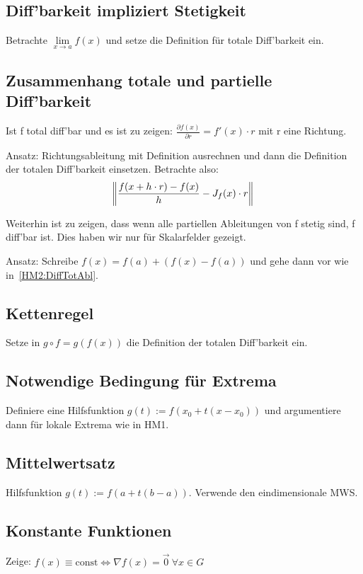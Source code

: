   \subsection{Diff'barkeit impliziert Stetigkeit}
  Betrachte $ \lim\limits_{x \rightarrow a}{f(x)}$ und setze die Definition für
  totale Diff'barkeit ein.

  \subsection{Zusammenhang totale und partielle Diff'barkeit}
  Ist f total diff'bar und es ist zu zeigen: $\frac{\partial f(x)}{\partial r} = f'(x) \cdot r$
  mit r eine Richtung.

  \vspace{0.5cm}

  Ansatz: Richtungsableitung mit Definition ausrechnen und dann die Definition der
  totalen Diff'barkeit einsetzen. Betrachte also:
  \begin{equation*}
      \norm{\frac{f(x+h \cdot r) - f(x)}{h} - J_f(x) \cdot r}
  \end{equation*}

  \vspace{0.5cm}

  Weiterhin ist zu zeigen, dass wenn alle partiellen Ableitungen von f stetig sind,
  f diff'bar ist. Dies haben wir nur für Skalarfelder gezeigt.

  Ansatz: Schreibe $f(x) = f(a) + (f(x) - f(a))$ und gehe dann vor wie in~\ref{HM2:DiffTotAbl}.

  \subsection{Kettenregel}
  Setze in $g \circ f = g(f(x))$ die Definition der totalen Diff'barkeit ein.

  \subsection{Notwendige Bedingung für Extrema}
  Definiere eine Hilfsfunktion $g(t):=f(x_0 + t(x-x_0))$ und argumentiere dann
  für lokale Extrema wie in HM1.

  \subsection{Mittelwertsatz}
  Hilfsfunktion $g(t):=f(a + t(b-a))$. Verwende den eindimensionale MWS.

  \subsection{Konstante Funktionen}
  Zeige: $f(x) \equiv \text{const} \Leftrightarrow \nabla f(x) = \vec0 \ \forall x \in G$

